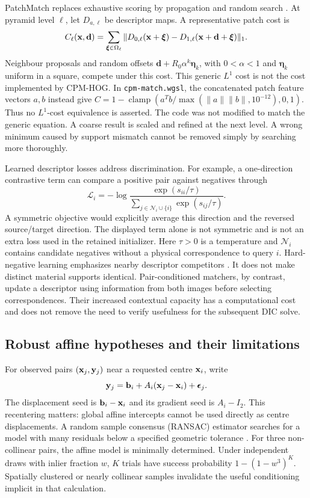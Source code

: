PatchMatch replaces exhaustive scoring by propagation and random search \citep{barnes,hu}. At pyramid level $\ell$, let $D_{a,\ell}$ be descriptor maps. A representative patch cost is
\begin{equation}
C_\ell(\mathbf x,\mathbf d)=\sum_{\boldsymbol\xi\in\Omega_\ell}
\|D_{0,\ell}(\mathbf x+\boldsymbol\xi)-D_{1,\ell}(\mathbf x+\mathbf d+\boldsymbol\xi)\|_1.
\end{equation}
Neighbour proposals and random offsets $\mathbf d+R_0\alpha^k\boldsymbol\eta_k$, with $0<\alpha<1$ and $\boldsymbol\eta_k$ uniform in a square, compete under this cost. This generic $L^1$ cost is not the cost implemented by CPM-HOG. In \texttt{cpm-match.wgsl}, the concatenated patch feature vectors $a,b$ instead give $C=1-\operatorname{clamp}(a^Tb/\max(\|a\|\|b\|,10^{-12}),0,1)$. Thus no $L^1$-cost equivalence is asserted. The code was not modified to match the generic equation. A coarse result is scaled and refined at the next level. A wrong minimum caused by support mismatch cannot be removed simply by searching more thoroughly.

Learned descriptor losses address discrimination. For example, a one-direction contrastive term can compare a positive pair against negatives through
\begin{equation}
\mathcal L_i=-\log\frac{\exp(s_{ii}/\tau)}{\sum_{j\in\mathcal N_i\cup\{i\}}\exp(s_{ij}/\tau)}.
\end{equation}
A symmetric objective would explicitly average this direction and the reversed source/target direction. The displayed term alone is not symmetric and is not an extra loss used in the retained initializer. Here $\tau>0$ is a temperature and $\mathcal N_i$ contains candidate negatives without a physical correspondence to query $i$. Hard-negative learning emphasizes nearby descriptor competitors \citep{hardnet}. It does not make distinct material supports identical. Pair-conditioned matchers, by contrast, update a descriptor using information from both images before selecting correspondences. Their increased contextual capacity has a computational cost and does not remove the need to verify usefulness for the subsequent DIC solve.

\subsection{Robust affine hypotheses and their limitations}
For observed pairs $(\mathbf x_j,\mathbf y_j)$ near a requested centre $\mathbf x_i$, write
\begin{equation}
\mathbf y_j=\mathbf b_i+A_i(\mathbf x_j-\mathbf x_i)+\boldsymbol\epsilon_j.
\end{equation}
The displacement seed is $\mathbf b_i-\mathbf x_i$ and its gradient seed is $A_i-I_2$. This recentering matters: global affine intercepts cannot be used directly as centre displacements. A random sample consensus (RANSAC) estimator searches for a model with many residuals below a specified geometric tolerance \citep{ransac}. For three non-collinear pairs, the affine model is minimally determined. Under independent draws with inlier fraction $w$, $K$ trials have success probability $1-(1-w^3)^K$. Spatially clustered or nearly collinear samples invalidate the useful conditioning implicit in that calculation.

